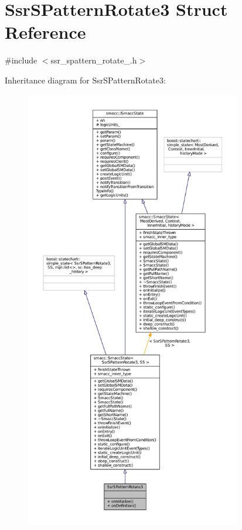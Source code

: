 \hypertarget{structSsrSPatternRotate3}{}\section{Ssr\+S\+Pattern\+Rotate3 Struct Reference}
\label{structSsrSPatternRotate3}


{\ttfamily \#include $<$ssr\+\_\+spattern\+\_\+rotate\+\_.\+h$>$}



Inheritance diagram for Ssr\+S\+Pattern\+Rotate3\+:
\nopagebreak
\begin{figure}[H]
\begin{center}
\leavevmode
\includegraphics[height=550pt]{structSsrSPatternRotate3__inherit__graph}
\end{center}
\end{figure}


